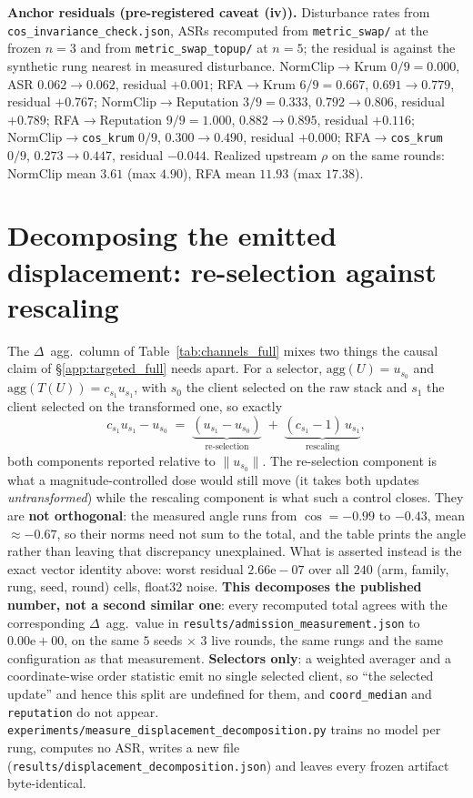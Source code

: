 \documentclass{article}
\begin{document}
\textbf{Anchor residuals (pre-registered caveat (iv)).} Disturbance rates from \texttt{cos\_invariance\_check.json}, ASRs recomputed from \texttt{metric\_swap/} at the frozen $n{=}3$ and from \texttt{metric\_swap\_topup/} at $n{=}5$; the residual is against the synthetic rung nearest in measured disturbance. NormClip$\to$Krum $0/9 = 0.000$, ASR $0.062 \to 0.062$, residual $+0.001$; RFA$\to$Krum $6/9 = 0.667$, $0.691 \to 0.779$, residual $\mathbf{+0.767}$; NormClip$\to$Reputation $3/9 = 0.333$, $0.792 \to 0.806$, residual $\mathbf{+0.789}$; RFA$\to$Reputation $9/9 = 1.000$, $0.882 \to 0.895$, residual $+0.116$; NormClip$\to$\texttt{cos\_krum} $0/9$, $0.300 \to 0.490$, residual $+0.000$; RFA$\to$\texttt{cos\_krum} $0/9$, $0.273 \to 0.447$, residual $-0.044$. Realized upstream $\rho$ on the same rounds: NormClip mean $3.61$ (max $4.90$), RFA mean $11.93$ (max $17.38$).

\section{Decomposing the emitted displacement: re-selection against rescaling}
\label{app:decomposition}

\noindent The $\Delta$~agg.\ column of Table~\ref{tab:channels_full} mixes two things the causal claim of §\ref{app:targeted_full} needs apart. For a selector, $\mathrm{agg}(U) = u_{s_0}$ and $\mathrm{agg}(T(U)) = c_{s_1} u_{s_1}$, with $s_0$ the client selected on the raw stack and $s_1$ the client selected on the transformed one, so exactly
\[ c_{s_1}u_{s_1} - u_{s_0} \;=\; \underbrace{(u_{s_1} - u_{s_0})}_{\text{re-selection}} \;+\; \underbrace{(c_{s_1}-1)\,u_{s_1}}_{\text{rescaling}}, \]
both components reported relative to $\|u_{s_0}\|$. The re-selection component is what a magnitude-controlled dose would still move (it takes both updates \emph{untransformed}) while the rescaling component is what such a control closes. They are \textbf{not orthogonal}: the measured angle runs from $\cos{=}{-}0.99$ to $-0.43$, mean ${\approx}{-}0.67$, so their norms need not sum to the total, and the table prints the angle rather than leaving that discrepancy unexplained. What is asserted instead is the exact vector identity above: worst residual $2.66\mathrm{e}{-}07$ over all $240$ (arm, family, rung, seed, round) cells, float32 noise. \textbf{This decomposes the published number, not a second similar one}: every recomputed total agrees with the corresponding $\Delta$~agg.\ value in \texttt{results/admission\_measurement.json} to $0.00\mathrm{e}{+}00$, on the same $5$ seeds $\times$ $3$ live rounds, the same rungs and the same configuration as that measurement. \textbf{Selectors only}: a weighted averager and a coordinate-wise order statistic emit no single selected client, so ``the selected update'' and hence this split are undefined for them, and \texttt{coord\_median} and \texttt{reputation} do not appear. \texttt{experiments/measure\_displacement\_decomposition.py} trains no model per rung, computes no ASR, writes a new file (\texttt{results/displacement\_decomposition.json}) and leaves every frozen artifact byte-identical.
\end{document}
